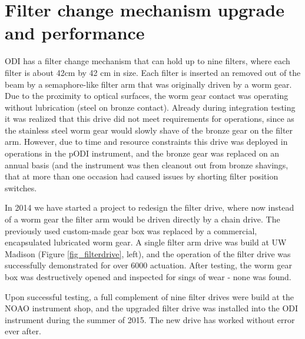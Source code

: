 \documentclass[]{spieman}
\begin{document}
\section{Filter change mechanism upgrade and performance}
ODI has a filter change mechanism that can hold up to nine filters, where each
filter is about 42cm by 42 cm in size. Each filter is inserted an removed out of
the beam by a semaphore-like filter arm that was originally driven by a worm
gear\cite{Muller2008}. Due to the proximity to optical surfaces, the worm gear
contact was operating without lubrication (steel on bronze contact). Already
during integration testing it was realized that this drive did not meet
requirements for operations, since as the stainless steel worm gear would slowly
shave of the bronze gear on the filter arm. However, due to time and resource
constraints this drive was deployed in operations in the pODI instrument, and
the bronze gear was replaced on an annual basis (and the instrument was then
cleanout out from bronze shavings, that at more than one occasion had caused
issues by shorting filter position switches.


In 2014 we have started a project to redesign the filter drive, where now 
instead of a worm gear the filter arm would be driven directly by a chain 
drive. The previously used custom-made gear box was replaced by a commercial, 
encapsulated lubricated worm gear. A single filter arm drive was build at UW 
Madison (Figure \ref{fig_filterdrive}, left), and the operation of the filter 
drive was successfully demonstrated for over 6000 actuation. After testing, the 
worm gear box was destructively opened and inspected for sings of wear - none 
was found. 
 
Upon successful testing, a full complement of nine filter drives were build at 
the NOAO instrument shop, and the upgraded filter drive was installed into the 
ODI instrument during the summer of 2015. The new drive has worked without 
error ever after. 
\end{document}
